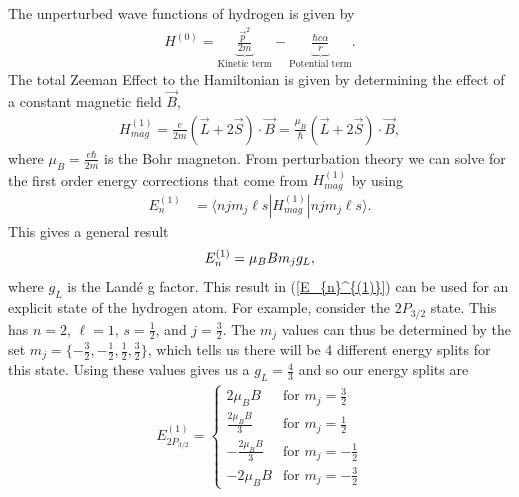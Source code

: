 \documentclass[landscape,a0paper,fontscale=0.285]{baposter} %
\begin{document}
\begin{poster}
{\begin{multicols}{2}
	The unperturbed wave functions of hydrogen is given by 
	\begin{align}
	H^{(0)} = \underbrace{\frac{\vec{p}^2}{2m}}_{\textrm{Kinetic term}}-\underbrace{\frac{\hbar c \alpha}{r}}_{\textrm{Potential term}}.
	\end{align}
	The total Zeeman Effect to the Hamiltonian is given by determining the effect of a constant magnetic field $\vec{B}$,
	\begin{align}
	H_{mag}^{(1)}= \frac{e}{2m}(\vec{L}+2\vec{S})\cdot \vec{B} = \frac{\mu_B}{\hbar}(\vec{L}+2\vec{S})\cdot \vec{B},
	\end{align} 
	where $\mu_B=\frac{e\hbar}{2m}$ is the Bohr magneton. From perturbation theory we can solve for the first order energy corrections that come from $H_{mag}^{(1)}$ by using 
	\begin{align}
	E_{n}^{(1)} &= \langle n j m_j \ell s| H_{mag}^{(1)}|n j m_j \ell s \rangle.
	\end{align}
	This gives a general result 
	\begin{align}
	E_{n}^{(1)}  = \mu_BBm_jg_L, \label{E_{n}^{(1)}}
	\end{align}
	where $g_L$ is the Land\'{e} g factor. This result in (\ref{E_{n}^{(1)}}) can be used for an explicit state of the hydrogen atom. For example, consider the $2P_{3/2}$ state. This has $n=2$, $\ell =1$, $s=\frac{1}{2}$, and $j=\frac{3}{2}$. The $m_j$ values can thus be determined by the set $m_j = \{-\frac{3}{2},-\frac{1}{2}, \frac{1}{2}, \frac{3}{2} \}$, which tells us there will be 4 different energy splits for this state. Using these values gives us a $g_L=\frac{4}{3}$ and so our energy splits are
	\begin{align}
	E_{2P_{3/2}}^{(1)} = \begin{cases}
	2\mu_BB & \textrm{for }m_j = \frac{3}{2}\\ 
	\frac{2\mu_BB}{3} & \textrm{for }m_j = \frac{1}{2} \\
	-\frac{2\mu_BB}{3}& \textrm{for }m_j = -\frac{1}{2} \\
	-2\mu_BB & \textrm{for }m_j = -\frac{3}{2}
	\end{cases}  \label{l=1 energies}
	\end{align}
\end{multicols}
\vspace{0.01cm}
}



\end{poster}
\end{document}
